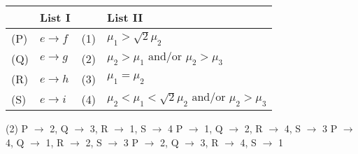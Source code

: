 \begin{center}
    \renewcommand{\arraystretch}{2}
    \begin{table}[h]
        \centering
        \begin{tabular}{p{0.25cm}p{8cm}|p{0.25cm}p{5cm}}
        \hline
        & List I & & List II \\
        \hline
        (P)& $e \rightarrow f$ & (1) & $\mu_1 > \sqrt{2} \mu_2$\\
        (Q)& $e \rightarrow g$ & (2) & $\mu_2 > \mu_1 \text{ and/or } \mu_2 > \mu_3$\\
        (R)& $e \rightarrow h$ & (3) & $\mu_1 = \mu_2$\\
        (S)& $e \rightarrow i$ & (4) & $\mu_2 < \mu_1 < \sqrt{2} \mu_2 \text{ and/or } \mu_2 > \mu_3$\\
        \hline
        \end{tabular}
    \end{table}
\end{center}

\begin{tasks}(2)
    \task P $\rightarrow$ 2, Q $\rightarrow$ 3, R $\rightarrow$ 1, S $\rightarrow$ 4
    \task P $\rightarrow$ 1, Q $\rightarrow$ 2, R $\rightarrow$ 4, S $\rightarrow$ 3
    \task P $\rightarrow$ 4, Q $\rightarrow$ 1, R $\rightarrow$ 2, S $\rightarrow$ 3
    \task P $\rightarrow$ 2, Q $\rightarrow$ 3, R $\rightarrow$ 4, S $\rightarrow$ 1
\end{tasks}